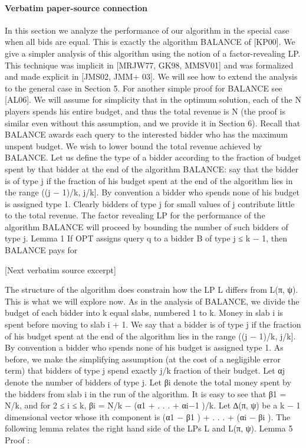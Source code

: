 \documentclass[10pt]{article}
\begin{document}
\paragraph{Verbatim paper-source connection}
\begin{ReviewVerbatim}
In this section we analyze the performance of our algorithm in the special case when all bids
are equal. This is exactly the algorithm BALANCE of [KP00]. We give a simpler analysis
of this algorithm using the notion of a factor-revealing LP. This technique was implicit in
[MRJW77, GK98, MMSV01] and was formalized and made explicit in [JMS02, JMM+ 03]. We
will see how to extend the analysis to the general case in Section 5. For another simple proof
for BALANCE see [AL06].
We will assume for simplicity that in the optimum solution, each of the N players spends
his entire budget, and thus the total revenue is N (the proof is similar even without this
assumption, and we provide it in Section 6). Recall that BALANCE awards each query to the
interested bidder who has the maximum unspent budget. We wish to lower bound the total
revenue achieved by BALANCE. Let us define the type of a bidder according to the fraction
of budget spent by that bidder at the end of the algorithm BALANCE: say that the bidder
is of type j if the fraction of his budget spent at the end of the algorithm lies in the range
((j − 1)/k, j/k]. By convention a bidder who spends none of his budget is assigned type 1.
Clearly bidders of type j for small values of j contribute little to the total revenue. The factor
revealing LP for the performance of the algorithm BALANCE will proceed by bounding the
number of such bidders of type j.
Lemma 1 If OPT assigns query q to a bidder B of type j ≤ k − 1, then BALANCE pays for

[Next verbatim source excerpt]

The structure of the algorithm does constrain how the LP L differs from L(π, ψ). This is what
we will explore now.
As in the analysis of BALANCE, we divide the budget of each bidder into k equal slabs,
numbered 1 to k. Money in slab i is spent before moving to slab i + 1. We say that a bidder
is of type j if the fraction of his budget spent at the end of the algorithm lies in the range
((j − 1)/k, j/k]. By convention a bidder who spends none of his budget is assigned type 1. As
before, we make the simplifying assumption (at the cost of a negligible error term) that bidders
of type j spend exactly j/k fraction of their budget. Let αj denote the number of bidders of
type j. Let βi denote the total money spent by the bidders from slab i in the run of the
algorithm. It is easy to see that β1 = N/k, and for 2 ≤ i ≤ k, βi = N/k − (α1 + . . . + αi−1 )/k.
Let ∆(π, ψ) be a k − 1 dimensional vector whose ith component is (α1 − β1 ) + . . . + (αi − βi ).
The following lemma relates the right hand side of the LPs L and L(π, ψ).
Lemma 5
Proof :
\end{ReviewVerbatim}
\end{document}
